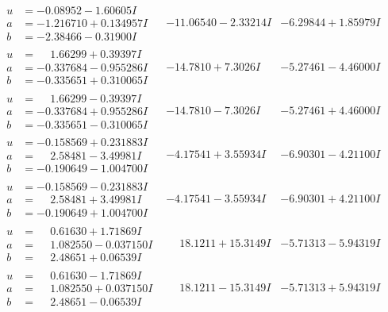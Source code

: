 \documentclass[1p]{elsarticle_modified}
\theoremstyle{definition}
\begin{document}
$$\begin{array}{c|c|c}
\begin{aligned}
u &= -0.08952 - 1.60605 I \\
a &= -1.216710 + 0.134957 I \\
b &= -2.38466 - 0.31900 I\end{aligned}
 & -11.06540 - 2.33214 I & -6.29844 + 1.85979 I \\ \hline\begin{aligned}
u &= \phantom{-}1.66299 + 0.39397 I \\
a &= -0.337684 - 0.955286 I \\
b &= -0.335651 + 0.310065 I\end{aligned}
 & -14.7810 + 7.3026 I & -5.27461 - 4.46000 I \\ \hline\begin{aligned}
u &= \phantom{-}1.66299 - 0.39397 I \\
a &= -0.337684 + 0.955286 I \\
b &= -0.335651 - 0.310065 I\end{aligned}
 & -14.7810 - 7.3026 I & -5.27461 + 4.46000 I \\ \hline\begin{aligned}
u &= -0.158569 + 0.231883 I \\
a &= \phantom{-}2.58481 - 3.49981 I \\
b &= -0.190649 - 1.004700 I\end{aligned}
 & -4.17541 + 3.55934 I & -6.90301 - 4.21100 I \\ \hline\begin{aligned}
u &= -0.158569 - 0.231883 I \\
a &= \phantom{-}2.58481 + 3.49981 I \\
b &= -0.190649 + 1.004700 I\end{aligned}
 & -4.17541 - 3.55934 I & -6.90301 + 4.21100 I \\ \hline\begin{aligned}
u &= \phantom{-}0.61630 + 1.71869 I \\
a &= \phantom{-}1.082550 - 0.037150 I \\
b &= \phantom{-}2.48651 + 0.06539 I\end{aligned}
 & \phantom{-}18.1211 + 15.3149 I & -5.71313 - 5.94319 I \\ \hline\begin{aligned}
u &= \phantom{-}0.61630 - 1.71869 I \\
a &= \phantom{-}1.082550 + 0.037150 I \\
b &= \phantom{-}2.48651 - 0.06539 I\end{aligned}
 & \phantom{-}18.1211 - 15.3149 I & -5.71313 + 5.94319 I \\ \hline\begin{aligned}

\end{aligned}
\end{array}$$
\end{document}
